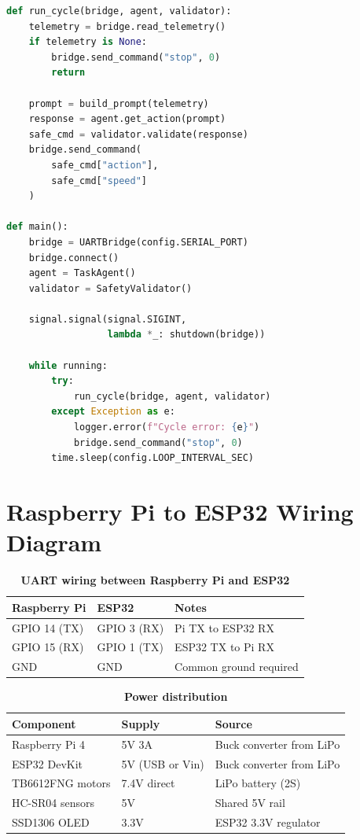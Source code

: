 \begin{lstlisting}[language=Python, caption={Intelligence layer main loop (simplified)}, label={lst:ai_main}]
def run_cycle(bridge, agent, validator):
    telemetry = bridge.read_telemetry()
    if telemetry is None:
        bridge.send_command("stop", 0)
        return

    prompt = build_prompt(telemetry)
    response = agent.get_action(prompt)
    safe_cmd = validator.validate(response)
    bridge.send_command(
        safe_cmd["action"],
        safe_cmd["speed"]
    )

def main():
    bridge = UARTBridge(config.SERIAL_PORT)
    bridge.connect()
    agent = TaskAgent()
    validator = SafetyValidator()

    signal.signal(signal.SIGINT,
                  lambda *_: shutdown(bridge))

    while running:
        try:
            run_cycle(bridge, agent, validator)
        except Exception as e:
            logger.error(f"Cycle error: {e}")
            bridge.send_command("stop", 0)
        time.sleep(config.LOOP_INTERVAL_SEC)
\end{lstlisting}

\section{Raspberry Pi to ESP32 Wiring Diagram}
\label{sec:wiring}

\begin{table}[H]
\centering
\caption[UART wiring between Pi and ESP32]{\textbf{UART wiring between Raspberry Pi and ESP32}}
\label{tab:uart_wiring}
\begin{tabularx}{\textwidth}{|l|l|X|}
\hline
\textbf{Raspberry Pi} & \textbf{ESP32} & \textbf{Notes} \\
\hline
GPIO 14 (TX) & GPIO 3 (RX) & Pi TX to ESP32 RX \\
\hline
GPIO 15 (RX) & GPIO 1 (TX) & ESP32 TX to Pi RX \\
\hline
GND & GND & Common ground required \\
\hline
\end{tabularx}
\end{table}

\begin{table}[H]
\centering
\caption[Power distribution]{\textbf{Power distribution}}
\label{tab:power}
\begin{tabularx}{\textwidth}{|l|l|X|}
\hline
\textbf{Component} & \textbf{Supply} & \textbf{Source} \\
\hline
Raspberry Pi 4 & 5V 3A & Buck converter from LiPo \\
\hline
ESP32 DevKit & 5V (USB or Vin) & Buck converter from LiPo \\
\hline
TB6612FNG motors & 7.4V direct & LiPo battery (2S) \\
\hline
HC-SR04 sensors & 5V & Shared 5V rail \\
\hline
SSD1306 OLED & 3.3V & ESP32 3.3V regulator \\
\hline
\end{tabularx}
\end{table}
